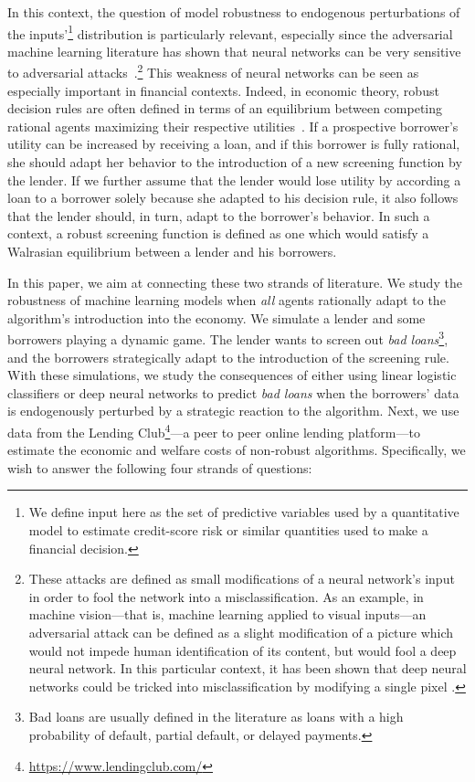 \documentclass[12pt]{article} %
\begin{document}
In this context, the question of model robustness to endogenous perturbations of the inputs'\footnote{We define input here as the set of predictive variables used by a quantitative model to estimate credit-score risk or similar quantities used to make a financial decision.} distribution is particularly relevant, especially since the adversarial machine learning literature has shown that neural networks can be very sensitive to adversarial attacks~\citep[see, e.g.,][]{szegedy2013intriguing,goodfellow2014explaining,papernot2017practical}.\footnote{These attacks are defined as small modifications of a neural network's input in order to fool the network into a misclassification. 
As an example, in machine vision---that is, machine learning applied to visual inputs---an adversarial attack can be defined as a slight modification of a picture which would not impede human identification of its content, but would fool a deep neural network. In this particular context, it has been shown that deep neural networks could be tricked into misclassification by modifying a single pixel \citep{su2019one}. 
}
This weakness of neural networks can be seen as especially important in financial contexts. Indeed, in economic theory, robust decision rules are often defined in terms of an equilibrium between competing rational agents maximizing their respective utilities~\citep[see, e.g.,][]{hansen2008robustness}.
If a prospective borrower's utility can be increased by receiving a loan, and if this borrower is fully rational, she should adapt her behavior to the introduction of a new screening function by the lender. If we further assume that the lender would lose utility by according a loan to a borrower solely because she adapted to his decision rule, it also follows that the lender should, in turn, adapt to the borrower's behavior. In such a context, a robust screening function is defined as one which would satisfy a Walrasian equilibrium between a 
lender and his borrowers.

In this paper, we aim at connecting these two strands of literature. We study the robustness of machine learning models when \textit{all} agents rationally adapt to the algorithm's introduction into the economy. We simulate a lender and some borrowers playing a dynamic game. The lender wants to screen out \textit{bad loans}\footnote{Bad loans are usually defined in the literature as loans with a high probability of default, partial default, or delayed payments.}, 
and the borrowers strategically adapt to the introduction of the screening rule. With these simulations, we study the consequences of either using linear logistic classifiers or deep neural networks to predict \textit{bad loans} when the borrowers' data is endogenously perturbed by a strategic reaction to the algorithm. Next, we use data from the Lending Club\footnote{\url{https://www.lendingclub.com/}}---a peer to peer online lending platform---to estimate the economic and welfare costs of non-robust algorithms. Specifically, we wish to answer the following four strands of questions: 
\end{document}
